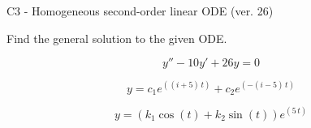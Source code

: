 \begin{exercise}
  \begin{exerciseTitle}C3 - Homogeneous second-order linear ODE (ver. 26)\end{exerciseTitle}
  \begin{exerciseStatement}
    
Find the general solution to the given ODE.

    
\[y''-10y'+26y = 0\]

  \end{exerciseStatement}
  \begin{exerciseAnswer}
    
\[y= c_{1} e^{\left(\left(i + 5\right) \, t\right)} + c_{2} e^{\left(-\left(i - 5\right) \, t\right)}\]

    
\[y= {\left(k_{1} \cos\left(t\right) + k_{2} \sin\left(t\right)\right)} e^{\left(5 \, t\right)}\]

  \end{exerciseAnswer}
\end{exercise}